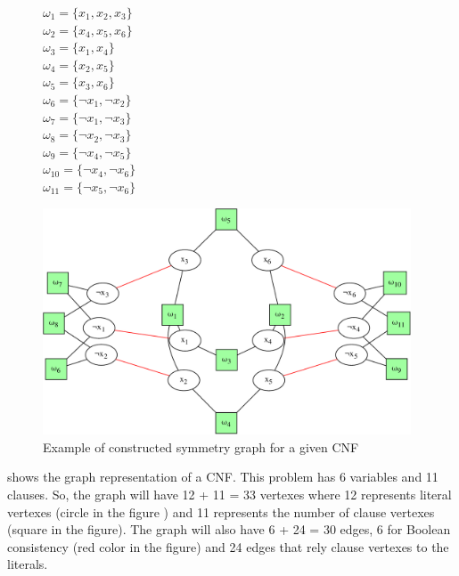 \begin{figure}[h!]
 \begin{minipage}[c]{.2\textwidth}
  $\omega_{1} = \{ x_{1}, x_{2}, x_{3} \}$ \\
  $\omega_{2} = \{ x_{4}, x_{5}, x_{6} \}$ \\
  $\omega_{3} = \{ x_{1}, x_{4} \}$ \\
  $\omega_{4} = \{ x_{2}, x_{5} \}$ \\
  $\omega_{5} = \{ x_{3}, x_{6} \}$ \\
  $\omega_{6} = \{ \neg x_{1}, \neg x_{2} \}$ \\
  $\omega_{7} = \{ \neg x_{1}, \neg x_{3} \}$ \\
  $\omega_{8} = \{ \neg x_{2}, \neg x_{3} \}$ \\
  $\omega_{9} = \{ \neg x_{4}, \neg x_{5} \}$ \\
  $\omega_{10} = \{ \neg x_{4}, \neg x_{6} \}$ \\
  $\omega_{11} = \{ \neg x_{5}, \neg x_{6} \}$ \\
  
 \end{minipage}
 \begin{minipage}[l]{.75\textwidth}
  \includegraphics[width=4.3in]{cnfs/graph_cnf_no_opt-crop}
 \end{minipage}
 \caption{Example of constructed symmetry graph for a given CNF}
 \label{fig:graph_no_opt}
\end{figure}

 shows the graph representation of a CNF. This problem has 6 variables and 11
clauses. So, the graph will have  12  + 11 = 33 vertexes where 12 represents literal vertexes (circle in the figure ) 
and 11 represents the number of clause vertexes (square in the figure). The graph will also have 6 + 24 = 30 edges, 6 for Boolean consistency 
(red color in the figure) and 24 edges that rely clause vertexes to the literals.

